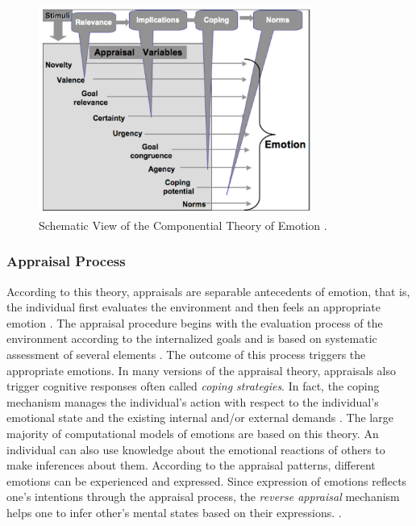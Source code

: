 \documentclass[11pt]{article}
\begin{document}
\begin{figure}[tbh]
  \center
  \includegraphics[width=0.8\textwidth]{figure/cpm.png}
  \caption{Schematic View of the Componential Theory of Emotion
  \cite{hudlicka:guidelines-emotions}.}
  \label{fig:cpm}
\end{figure}

\subsubsection{Appraisal Process}
\label{sec:appraisal-process}

According to this theory, appraisals are separable antecedents of emotion, that
is, the individual first evaluates the environment and then feels an appropriate
emotion \cite{scherer:appraisal-processes}. The appraisal procedure begins with
the evaluation process of the environment according to the internalized goals
and is based on systematic assessment of several elements
\cite{scherer:sequential-appraisal-process}. The outcome of this process
triggers the appropriate emotions. In many versions of the appraisal theory,
appraisals also trigger cognitive responses often called \textit{coping
strategies}. In fact, the coping mechanism manages the individual's action with
respect to the individual's emotional state and the existing internal and/or
external demands \cite{folkman:coping-pitfalls-promise}. The large majority of
computational models of emotions are based on this theory. An individual can
also use knowledge about the emotional reactions of others to make inferences
about them. According to the appraisal patterns, different emotions can be
experienced and expressed. Since expression of emotions reflects one's
intentions through the appraisal process, the \textit{reverse appraisal}
mechanism helps one to infer other's mental states based on their expressions.
\cite{gratch:reverse-appraisal, hareli:emotional-reaction-perception}.
\end{document}
